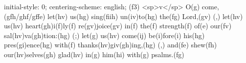 initial-style: 0;
centering-scheme: english;
(f3) <sp>v</sp> O(g) come,(gfh/ghf/gffe) let(hv) us(hg) sing(fiih) un(iv)to(hg) the(fg) Lord,(gv) (,) let(hv) us(hv) heart(gh)i(f)ly(f) re(gv)joice(gv) in(f) the(f) strength(f) of(e) our(fv) sal(hv)va(gh)tion:(hg) (;) let(g) us(hv) come(ij) be(i)fore(i) his(hg) pres(gi)ence(hg) with(f) thanks(hv)giv(gh)ing,(hg) (,) and(fe) shew(fh) our(hv)selves(gh) glad(hv) in(g) him(hi) with(g) psalms.(fg)
